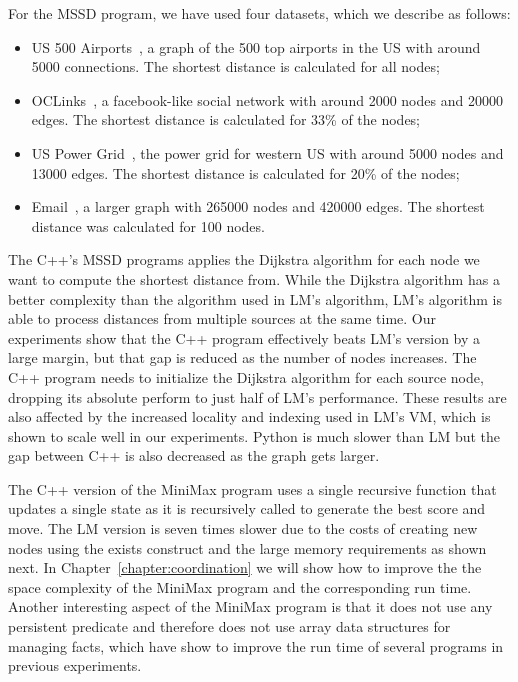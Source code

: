 For the MSSD program, we have used four datasets, which we describe as follows:

\begin{itemize}
   \item US 500 Airports~\cite{usairports,tnet}, a graph of the 500 top airports in the US with around
      5000 connections. The shortest distance is calculated for all nodes;
      
   \item OCLinks~\cite{tnet,oclinks}, a facebook-like social network with around 2000 nodes and 20000 edges. The shortest
      distance is calculated for 33\% of the nodes;

   \item US Power Grid~\cite{tnet,uspowergrid}, the power grid for western US with around 5000
      nodes and 13000 edges. The shortest distance is calculated for 20\% of the
      nodes;

   \item Email~\cite{snapnets}, a larger graph with 265000 nodes and 420000
      edges. The shortest distance was calculated for 100 nodes.

\end{itemize}

The C++'s MSSD programs applies the Dijkstra algorithm for each node we want to
compute the shortest distance from. While the Dijkstra algorithm has a better
complexity than the algorithm used in LM's algorithm, LM's algorithm is able to
process distances from multiple sources at the same time. Our experiments show
that the C++ program effectively beats LM's version by a large margin, but that
gap is reduced as the number of nodes increases. The C++ program needs to
initialize the Dijkstra algorithm for each source node, dropping its absolute
perform to just half of LM's performance. These results are also affected by the
increased locality and indexing used in LM's VM, which is shown to scale well in
our experiments. Python is much slower than LM but the gap between C++ is also
decreased as the graph gets larger.

The C++ version of the MiniMax program uses a single recursive function that
updates a single state as it is recursively called to generate the best score
and move. The LM version is seven times slower due to the costs of creating new
nodes using the exists construct and the large memory requirements as shown
next. In Chapter~\ref{chapter:coordination} we will show how to improve the the
space complexity of the MiniMax program and the corresponding run time.  Another
interesting aspect of the MiniMax program is that it does not use any persistent
predicate and therefore does not use array data structures for managing facts,
which have show to improve the run time of several programs in previous
experiments.

